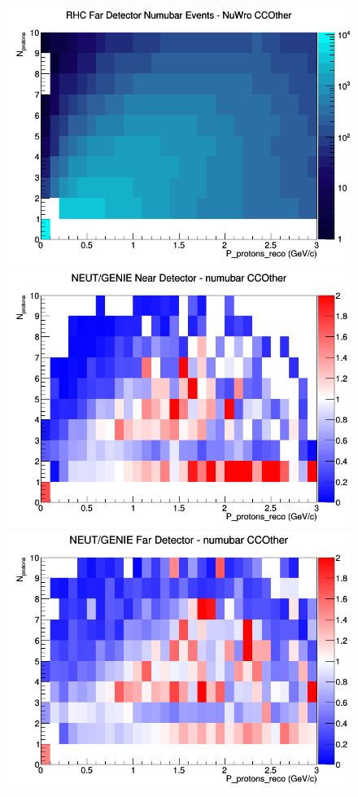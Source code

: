 \documentclass[12pt]{article}
\begin{document}
\begin{figure}[h]
\endminipage
{}
\includegraphics[width=\linewidth]{eff_N_P/GAr/protons/CCOther_RHC_FD_numubar_N_P_NuWro.png}
\endminipage
\newline
{}
\includegraphics[width=\linewidth]{eff_N_P/GAr/protons/ratios/CCOther_NEUT_GENIE_numubar_near_N_P.png}
\endminipage
{}
\includegraphics[width=\linewidth]{eff_N_P/GAr/protons/ratios/CCOther_NEUT_GENIE_numubar_far_N_P.png}

\end{figure}
\end{document}
